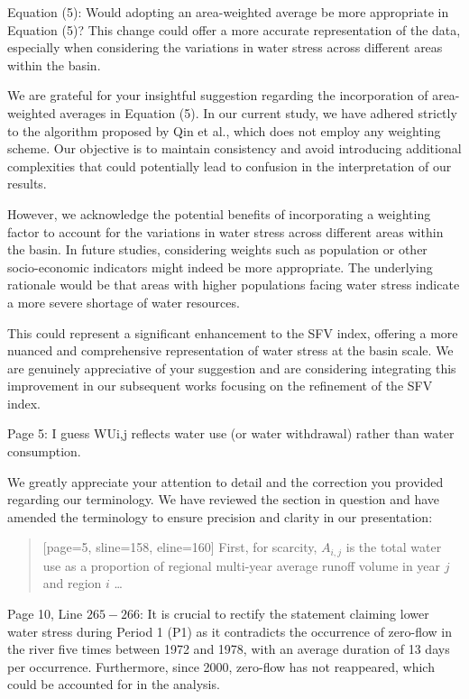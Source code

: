 \RC{} Equation (5): Would adopting an area-weighted average be more appropriate in Equation (5)? This change could offer a more accurate representation of the data, especially when considering the variations in water stress across different areas within the basin.

\AR{} We are grateful for your insightful suggestion regarding the incorporation of area-weighted averages in Equation (5). In our current study, we have adhered strictly to the algorithm proposed by Qin et al., which does not employ any weighting scheme. Our objective is to maintain consistency and avoid introducing additional complexities that could potentially lead to confusion in the interpretation of our results.

\AR*{} However, we acknowledge the potential benefits of incorporating a weighting factor to account for the variations in water stress across different areas within the basin. In future studies, considering weights such as population or other socio-economic indicators might indeed be more appropriate. The underlying rationale would be that areas with higher populations facing water stress indicate a more severe shortage of water resources.

\AR*{} This could represent a significant enhancement to the SFV index, offering a more nuanced and comprehensive representation of water stress at the basin scale. We are genuinely appreciative of your suggestion and are considering integrating this improvement in our subsequent works focusing on the refinement of the SFV index.

\RC{} Page 5: I guess WUi,j reflects water use (or water withdrawal) rather than water consumption.

\AR{} We greatly appreciate your attention to detail and the correction you provided regarding our terminology. We have reviewed the section in question and have amended the terminology to ensure precision and clarity in our presentation:

\begin{quote}[page=5, sline=158, eline=160]
	First, for scarcity, $A_{i, j}$ is the total water use as a proportion of regional multi-year average runoff volume in year $j$ and region $i$ \dots
\end{quote}

\RC{} Page 10, Line $265-266$: It is crucial to rectify the statement claiming lower water stress during Period 1 (P1) as it contradicts the occurrence of zero-flow in the river five times between 1972 and 1978, with an average duration of 13 days per occurrence. Furthermore, since 2000, zero-flow has not reappeared, which could be accounted for in the analysis.

